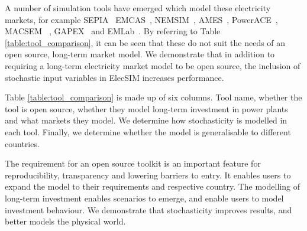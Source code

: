 


A number of simulation tools have emerged which model these electricity markets, for example SEPIA~\cite{Harp2000} EMCAS~\cite{Conzelmann}, NEMSIM~\cite{Batten2006}, AMES~\cite{Sun2007}, PowerACE~\cite{Rothengatter2007}, MACSEM ~\cite{Praca2003}, GAPEX~\cite{Cincotti2013} and  EMLab~\cite{Chappin2017}. By referring to Table \ref{table:tool_comparison}, it can be seen that these do not suit the needs of an open source, long-term market model. We demonstrate that in addition to requiring a long-term electricity market model to be open source, the inclusion of stochastic input variables in ElecSIM increases performance. 

Table \ref{table:tool_comparison} is made up of six columns. Tool name, whether the tool is open source, whether they model long-term investment in power plants and what markets they model. We determine how stochasticity is modelled in each tool. Finally, we determine whether the model is generalisable to different countries.  

The requirement for an open source toolkit is an important feature for reproducibility, transparency and lowering barriers to entry. It enables users to expand the model to their requirements and respective country. The modelling of long-term investment enables scenarios to emerge, and enable users to model investment behaviour. We demonstrate that stochasticity improves results, and better models the physical world.

